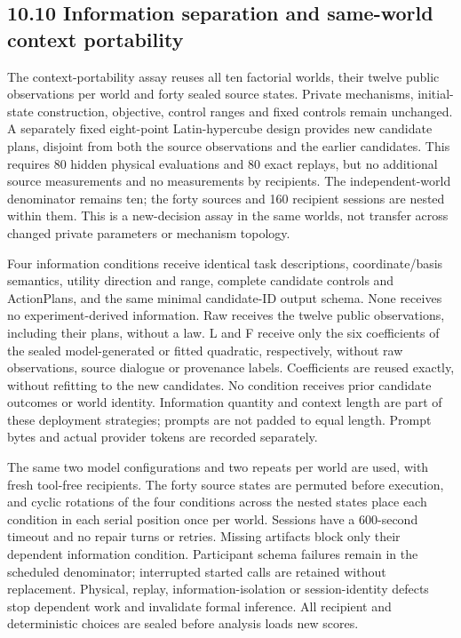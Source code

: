 \documentclass[10pt,twocolumn]{article}
\begin{document}
\subsection{10.10 Information separation and same-world context
portability}\label{information-separation-and-same-world-context-portability}

The context-portability assay reuses all ten factorial worlds, their
twelve public observations per world and forty sealed source states.
Private mechanisms, initial-state construction, objective, control
ranges and fixed controls remain unchanged. A separately fixed
eight-point Latin-hypercube design provides new candidate plans,
disjoint from both the source observations and the earlier candidates.
This requires 80 hidden physical evaluations and 80 exact replays, but
no additional source measurements and no measurements by recipients. The
independent-world denominator remains ten; the forty sources and 160
recipient sessions are nested within them. This is a new-decision assay
in the same worlds, not transfer across changed private parameters or
mechanism topology.

Four information conditions receive identical task descriptions,
coordinate/basis semantics, utility direction and range, complete
candidate controls and ActionPlans, and the same minimal candidate-ID
output schema. None receives no experiment-derived information. Raw
receives the twelve public observations, including their plans, without
a law. L and F receive only the six coefficients of the sealed
model-generated or fitted quadratic, respectively, without raw
observations, source dialogue or provenance labels. Coefficients are
reused exactly, without refitting to the new candidates. No condition
receives prior candidate outcomes or world identity. Information
quantity and context length are part of these deployment strategies;
prompts are not padded to equal length. Prompt bytes and actual provider
tokens are recorded separately.

The same two model configurations and two repeats per world are used,
with fresh tool-free recipients. The forty source states are permuted
before execution, and cyclic rotations of the four conditions across the
nested states place each condition in each serial position once per
world. Sessions have a 600-second timeout and no repair turns or
retries. Missing artifacts block only their dependent information
condition. Participant schema failures remain in the scheduled
denominator; interrupted started calls are retained without replacement.
Physical, replay, information-isolation or session-identity defects stop
dependent work and invalidate formal inference. All recipient and
deterministic choices are sealed before analysis loads new scores.
\end{document}
